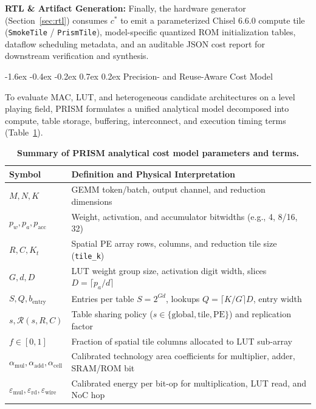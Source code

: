 \documentclass[10pt,letterpaper,twocolumn]{article}
\makeatletter
\renewcommand\section{\@startsection {section}{1}{\z@}%
  {-1.6ex \@plus -0.4ex \@minus -0.2ex}%
  {0.7ex \@plus 0.2ex}%
  {\normalfont\large\bfseries\color{primary}}}
\makeatother
\begin{document}
\textbf{RTL \& Artifact Generation:} Finally, the hardware generator (Section~\ref{sec:rtl}) consumes $c^*$ to emit a parameterized Chisel 6.6.0 compute tile (\texttt{SmokeTile} / \texttt{PrismTile}), model-specific quantized ROM initialization tables, dataflow scheduling metadata, and an auditable JSON cost report for downstream verification and synthesis.

\section{Precision- and Reuse-Aware Cost Model}
\label{sec:cost_model}

To evaluate MAC, LUT, and heterogeneous candidate architectures on a level playing field, PRISM formulates a unified analytical model decomposed into compute, table storage, buffering, interconnect, and execution timing terms (Table~\ref{tab:model_terms}).

\begin{table}[t]
  \centering
  \caption{\textbf{Summary of PRISM analytical cost model parameters and terms.}}
  \label{tab:model_terms}
  \footnotesize
  \setlength{\tabcolsep}{3.0pt}
  \begin{tabularx}{\columnwidth}{lX}
    \toprule
    \textbf{Symbol} & \textbf{Definition and Physical Interpretation} \\
    \midrule
    $M, N, K$ & GEMM token/batch, output channel, and reduction dimensions \\
    $p_w, p_a, p_{\text{acc}}$ & Weight, activation, and accumulator bitwidths (e.g., 4, 8/16, 32) \\
    $R, C, K_t$ & Spatial PE array rows, columns, and reduction tile size (\texttt{tile\_k}) \\
    $G, d, D$ & LUT weight group size, activation digit width, slices $D = \lceil p_a/d \rceil$ \\
    $S, Q, b_{\text{entry}}$ & Entries per table $S=2^{Gd}$, lookups $Q=\lceil K/G \rceil D$, entry width \\
    $s, \mathcal{R}(s,R,C)$ & Table sharing policy ($s \in \{\text{global}, \text{tile}, \text{PE}\}$) and replication factor \\
    $f \in [0, 1]$ & Fraction of spatial tile columns allocated to LUT sub-array \\
    $\alpha_{\text{mul}}, \alpha_{\text{add}}, \alpha_{\text{cell}}$ & Calibrated technology area coefficients for multiplier, adder, SRAM/ROM bit \\
    $\varepsilon_{\text{mul}}, \varepsilon_{\text{rd}}, \varepsilon_{\text{wire}}$ & Calibrated energy per bit-op for multiplication, LUT read, and NoC hop \\
    \bottomrule
  \end{tabularx}
\end{table}
\end{document}
